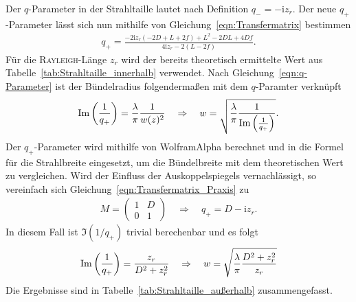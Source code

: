 \documentclass[a4paper,twoside,final]{article}
\begin{document}
Der $q$-Parameter in der Strahltaille lautet nach Definition $q_- = -\mathrm{i} z_r$. Der neue $q_+$-Parameter lässt sich nun mithilfe von Gleichung~\eqref{eqn:Transfermatrix} bestimmen
\begin{align}
  q_+ = \frac{-2\mathrm{i}z_r(-2D+L+2f) + L^2 -2DL + 4Df}{4\mathrm{i}z_r -2(L-2f)}.
\end{align}
Für die \textsc{Rayleigh}-Länge $z_r$ wird der bereits theoretisch ermittelte Wert aus Tabelle~\ref{tab:Strahltaille_innerhalb} verwendet.
Nach Gleichung~\eqref{eqn:q-Parameter} ist der Bündelradius folgendermaßen mit dem $q$-Paramter verknüpft
\begin{align}
  \Im\qty(\frac{1}{q_+}) = \frac{\lambda}{\pi}\frac{1}{w(z)^2} \quad \Rightarrow \quad w = \sqrt{\frac{\lambda}{\pi}\frac{1}{\Im\qty(\frac{1}{q_+})}}.
\end{align}
Der $q_+$-Parameter wird mithilfe von WolframAlpha berechnet und in die Formel für die Strahlbreite eingesetzt, um die Bündelbreite mit dem theoretischen Wert zu vergleichen. Wird der Einfluss der Auskoppelspiegels vernachlässigt, so vereinfach sich Gleichung~\eqref{eqn:Transfermatrix_Praxis} zu
\begin{align}
  M = \begin{pmatrix}
  1 & D \\ 0 & 1
\end{pmatrix} \quad \Rightarrow \quad q_+ = D-\mathrm{i}z_r.
\end{align}
In diesem Fall ist $\Im(1/q_+)$ trivial berechenbar und es folgt
\begin{align}
    \Im\qty(\frac{1}{q_+}) = \frac{z_r}{D^2 + z_r^2} \quad \Rightarrow \quad w = \sqrt{\frac{\lambda}{\pi}\frac{D^2 + z_r^2}{z_r}}
\end{align}
Die Ergebnisse sind in Tabelle~\ref{tab:Strahltaille_außerhalb} zusammengefasst.
\end{document}

